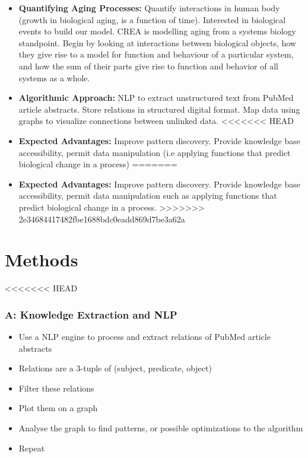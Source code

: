 \documentclass[11pt]{article}
\begin{document}
\begin{itemize}
\begin{itemize}
\item \textbf{Quantifying Aging Processes:} Quantify interactions in human body (growth in biological aging, is a function of time). Interested in biological events to build our model. CREA is modelling aging from a systems biology standpoint. Begin by looking at interactions between biological objects, how they give rise to a model for function and behaviour of a particular system, and how the sum of their parts give rise to function and behavior of all systems as a whole.  
\item \textbf{Algorithmic Approach:} NLP to extract unstructured text from PubMed article abstracts. Store relations in structured digital format. Map data using graphs to visualize connections between unlinked data.
<<<<<<< HEAD
\item \textbf{Expected Advantages:} Improve pattern discovery. Provide knowledge base accessibility, permit data manipulation (i.e applying functions that predict biological change in a process)
=======
\item \textbf{Expected Advantages:} Improve pattern discovery. Provide knowledge base accessibility, permit data manipulation such as applying functions that predict biological change in a process. 
>>>>>>> 2e34684417482fbe1688bdc0eadd869d7be3a62a
\end{itemize}

\section{Methods}

<<<<<<< HEAD
\subsubsection*{A:  Knowledge Extraction and NLP}
\begin{itemize}
\item Use a NLP engine to process and extract relations of PubMed article abstracts
\item Relations are a 3-tuple of (subject, predicate, object)
\item Filter these relations
\item Plot them on a graph
\item Analyse the graph to find patterns, or possible optimizations to the algorithm
\item Repeat
\end{itemize}


\end{itemize}
\end{document}
